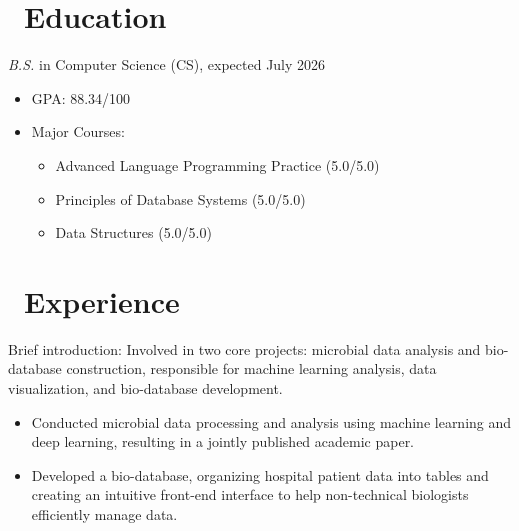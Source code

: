 \documentclass{resume}
\begin{document}



\section{\faGraduationCap\ Education}
\textit{B.S.} in Computer Science (CS), expected July 2026
\begin{itemize}
  \item GPA: 88.34/100
  \item Major Courses:
    \begin{itemize} 
      \item Advanced Language Programming Practice (5.0/5.0)
      \item Principles of Database Systems (5.0/5.0)
      \item Data Structures (5.0/5.0)
    \end{itemize}
\end{itemize}

\section{\faUsers\ Experience}
Brief introduction: Involved in two core projects: microbial data analysis and bio-database construction, responsible for machine learning analysis, data visualization, and bio-database development.
\begin{itemize}
  \item Conducted microbial data processing and analysis using machine learning and deep learning, resulting in a jointly published academic paper. 
  \item Developed a bio-database, organizing hospital patient data into tables and creating an intuitive front-end interface to help non-technical biologists efficiently manage data. 
\end{itemize}
\end{document}
